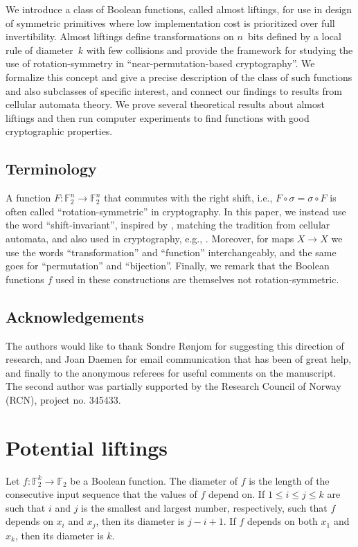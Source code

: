 \documentclass[11pt,english,a4paper]{amsart}
\theoremstyle{plain}
\theoremstyle{definition}
\theoremstyle{remark}
\newcommand{\F}{\mathbb{F}}
\begin{document}
We introduce a class of Boolean functions, called almost liftings, for use in design of symmetric primitives where low implementation cost is prioritized over full invertibility. Almost liftings define transformations on $n$~bits defined by a local rule of diameter~$k$ with few collisions and provide the framework for studying the use of rotation-symmetry in ``near-permutation-based cryptography''. We formalize this concept and give a precise description of the class of such functions and also subclasses of specific interest, and connect our findings to results from cellular automata theory. We prove several theoretical results about almost liftings and then run computer experiments to find functions with good cryptographic properties.


    \subsection*{Terminology}

A function $F\colon\F_2^n\to\F_2^n$ that commutes with the right shift, i.e., $F\circ\sigma=\sigma\circ F$ is often called ``rotation-symmetric'' in cryptography. In this paper, we instead use the word ``shift-invariant'', inspired by \cite[Section~6]{JDA-thesis}, matching the tradition from cellular automata, and also used in cryptography, e.g., \cite[Section~2.1]{mariot2021evolutionary}. Moreover, for maps $X\to X$ we use the words ``transformation'' and ``function'' interchangeably, and the same goes for ``permutation'' and ``bijection''. Finally, we remark that the Boolean functions $f$ used in these constructions are themselves not rotation-symmetric.

\subsection*{Acknowledgements}
The authors would like to thank Sondre Rønjom for suggesting this direction of research, and Joan Daemen for email communication that has been of great help, and finally to the anonymous referees for useful comments on the manuscript. The second author was partially supported by the Research Council of Norway (RCN), project no. 345433.



	\section{Potential liftings}\label{sec-potential}
	
	Let $f\colon\F_2^k\to\F_2$ be a Boolean function.
	The diameter of $f$ is the length of the consecutive input sequence that the values of $f$ depend on. If $1\leq i\leq j\leq k$ are such that $i$ and $j$ is the smallest and largest number, respectively, such that $f$ depends on $x_i$ and $x_j$, then its diameter is $j-i+1$. If $f$ depends on both $x_1$ and $x_k$, then its diameter is $k$.
	
\end{document}
